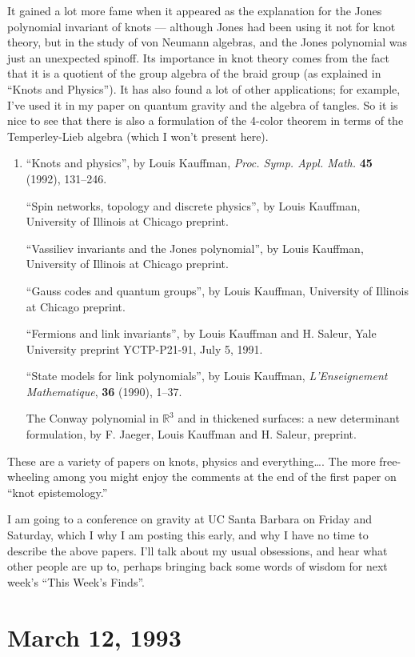 \documentclass{article}
\begin{document}
It gained a lot more fame when it appeared as the explanation for the
Jones polynomial invariant of knots --- although Jones had been using it
not for knot theory, but in the study of von Neumann algebras, and the
Jones polynomial was just an unexpected spinoff. Its importance in knot
theory comes from the fact that it is a quotient of the group algebra of
the braid group (as explained in ``Knots and Physics''). It has also
found a lot of other applications; for example, I've used it in my paper
on quantum gravity and the algebra of tangles. So it is nice to see that
there is also a formulation of the 4-color theorem in terms of the
Temperley-Lieb algebra (which I won't present here).

\begin{enumerate}
\def\labelenumi{\arabic{enumi})}
\setcounter{enumi}{1}
\item
  ``Knots and physics'', by Louis Kauffman, \emph{Proc. Symp. Appl.
  Math.} \textbf{45} (1992), 131--246.

  ``Spin networks, topology and discrete physics'', by Louis Kauffman,
  University of Illinois at Chicago preprint.

  ``Vassiliev invariants and the Jones polynomial'', by Louis Kauffman,
  University of Illinois at Chicago preprint.

  ``Gauss codes and quantum groups'', by Louis Kauffman, University of
  Illinois at Chicago preprint.

  ``Fermions and link invariants'', by Louis Kauffman and H. Saleur,
  Yale University preprint YCTP-P21-91, July 5, 1991.

  ``State models for link polynomials'', by Louis Kauffman,
  \emph{L'Enseignement Mathematique}, \textbf{36} (1990), 1--37.

  The Conway polynomial in \(\mathbb{R}^3\) and in thickened surfaces: a
  new determinant formulation, by F. Jaeger, Louis Kauffman and H.
  Saleur, preprint.
\end{enumerate}

These are a variety of papers on knots, physics and everything\ldots.
The more free-wheeling among you might enjoy the comments at the end of
the first paper on ``knot epistemology.''

I am going to a conference on gravity at UC Santa Barbara on Friday and
Saturday, which I why I am posting this early, and why I have no time to
describe the above papers. I'll talk about my usual obsessions, and hear
what other people are up to, perhaps bringing back some words of wisdom
for next week's ``This Week's Finds''.
\hypertarget{week9}{%
\section{March 12, 1993}\label{week9}}
\end{document}
